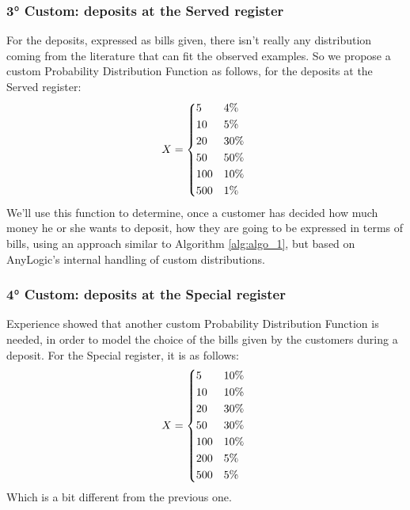 \documentclass{article}
\begin{document}
\subsubsection{3° Custom: deposits at the Served register}
For the deposits, expressed as bills given, there isn't really any distribution coming from the literature that can fit the observed examples. So we propose a custom Probability Distribution Function as follows, for the deposits at the Served register:
 \begin{equation*}
    X =
    \begin{cases*}
      \text{5} & $4\%$ \\
      \text{10} & $5\%$ \\
      \text{20} & $30\%$ \\
      \text{50} & $50\%$ \\
      \text{100} & $10\%$ \\
      \text{500} & $1\%$ \\
    \end{cases*}
  \end{equation*}
We'll use this function to determine, once a customer has decided how much money he or she wants to deposit, how they are going to be expressed in terms of bills, using an approach similar to Algorithm \ref{alg:algo_1}, but based on AnyLogic's internal handling of custom distributions.

\subsubsection{4° Custom: deposits at the Special register} \label{pdf_d_special}
Experience showed that another custom Probability Distribution Function is needed, in order to model the choice of the bills given by the customers during a deposit. For the Special register, it is as follows:
\begin{equation*}
    X =
    \begin{cases*}
      \text{5} & $10\%$ \\
      \text{10} & $10\%$ \\
      \text{20} & $30\%$ \\
      \text{50} & $30\%$ \\
      \text{100} & $10\%$ \\
      \text{200} & $5\%$ \\
      \text{500} & $5\%$ \\
    \end{cases*}
  \end{equation*}
Which is a bit different from the previous one.
\end{document}
